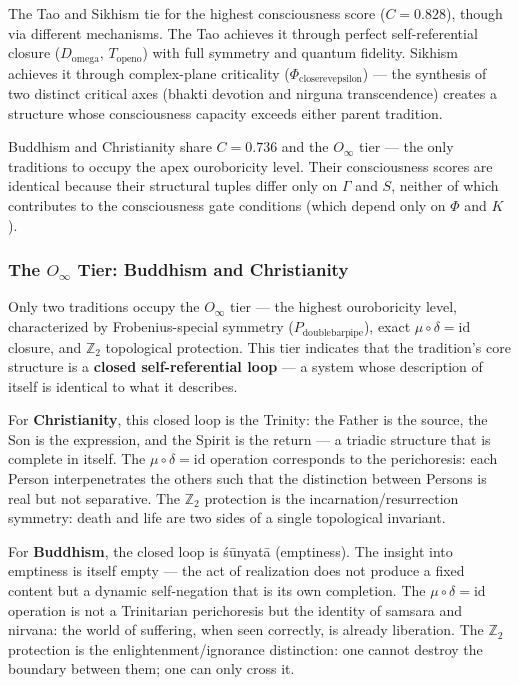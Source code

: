 \documentclass[12pt,a4paper]{article}
\begin{document}
The Tao and Sikhism tie for the highest consciousness score ($C = 0.828$), though via different mechanisms. The Tao achieves it through perfect self-referential closure ($D_{\text{omega}}$, $T_{\text{openo}}$) with full symmetry and quantum fidelity. Sikhism achieves it through complex-plane criticality ($\Phi_{\text{closerevepsilon}}$) --- the synthesis of two distinct critical axes (bhakti devotion and nirguna transcendence) creates a structure whose consciousness capacity exceeds either parent tradition.

Buddhism and Christianity share $C = 0.736$ and the $O_{\infty}$ tier --- the only traditions to occupy the apex ouroboricity level. Their consciousness scores are identical because their structural tuples differ only on $\Gamma$ and $S$, neither of which contributes to the consciousness gate conditions (which depend only on $\Phi$ and $K$).

\subsubsection{The $O_{\infty}$ Tier: Buddhism and Christianity}

Only two traditions occupy the $O_{\infty}$ tier --- the highest ouroboricity level, characterized by Frobenius-special symmetry ($P_{\text{doublebarpipe}}$), exact $\mu\circ\delta = \text{id}$ closure, and $\mathbb{Z}_2$ topological protection. This tier indicates that the tradition's core structure is a \textbf{closed self-referential loop} --- a system whose description of itself is identical to what it describes.

For \textbf{Christianity}, this closed loop is the Trinity: the Father is the source, the Son is the expression, and the Spirit is the return --- a triadic structure that is complete in itself. The $\mu\circ\delta = \text{id}$ operation corresponds to the perichoresis: each Person interpenetrates the others such that the distinction between Persons is real but not separative. The $\mathbb{Z}_2$ protection is the incarnation/resurrection symmetry: death and life are two sides of a single topological invariant.

For \textbf{Buddhism}, the closed loop is śūnyatā (emptiness). The insight into emptiness is itself empty --- the act of realization does not produce a fixed content but a dynamic self-negation that is its own completion. The $\mu\circ\delta = \text{id}$ operation is not a Trinitarian perichoresis but the identity of samsara and nirvana: the world of suffering, when seen correctly, is already liberation. The $\mathbb{Z}_2$ protection is the enlightenment/ignorance distinction: one cannot destroy the boundary between them; one can only cross it.
\end{document}
